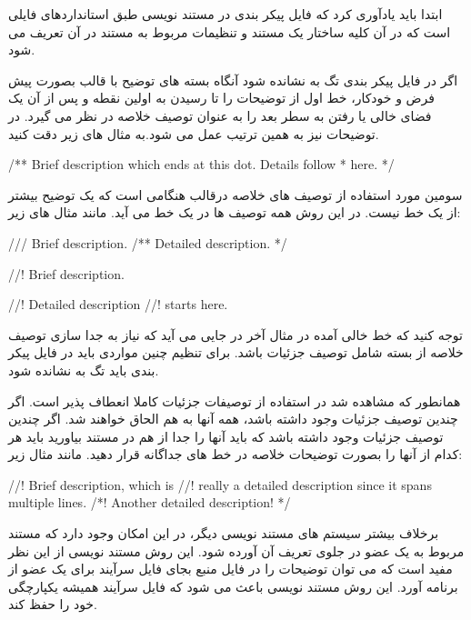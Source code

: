 ابتدا باید یادآوری کرد که فایل پیکر بندی در مستند نویسی طبق استانداردهای
 فایلی است که در آن کلیه ساختار یک مستند و تنظیمات مربوط به مستند در
آن تعریف می شود.

اگر در فایل پیکر بندی تگ   به  نشانده شود آنگاه
بسته های توضیح با قالب  بصورت پیش فرض و خودکار، خط اول از توضیحات را
تا رسیدن به اولین نقطه و پس از آن یک فضای خالی یا رفتن به سطر بعد را به عنوان
توصیف خلاصه در نظر می گیرد.
در توضیحات  نیز به همین ترتیب عمل می شود.به مثال های زیر دقت کنید.

\begin{C++}
/** Brief description which ends at this dot. Details follow
 *  here.
 */
\end{C++}

سومین مورد استفاده از توصیف های خلاصه درقالب  هنگامی است که یک
توضیح بیشتر از یک خط نیست. در این روش همه توصیف ها در یک خط می آید. مانند مثال
های زیر:

\begin{C++}
/// Brief description.
/** Detailed description. */

//! Brief description.

//! Detailed description
//! starts here.
\end{C++}

توجه کنید که خط خالی آمده در مثال آخر در جایی می آید که نیاز به جدا سازی توصیف
خلاصه از بسته شامل توصیف جزئیات باشد.
برای تنظیم چنین مواردی باید در فایل پیکر بندی باید تگ  به
 نشانده شود.

همانطور که مشاهده شد در استفاده از توصیفات جزئیات  کاملا انعطاف پذیر
است. اگر چندین توصیف جزئیات وجود داشته باشد، همه آنها به هم الحاق خواهند شد.
اگر چندین توصیف جزئیات وجود داشته باشد که باید آنها را جدا از هم در مستند
بیاورید باید هر کدام از آنها را بصورت توضیحات خلاصه در خط های جداگانه قرار دهید.
مانند مثال زیر:

\begin{C++}
//! Brief description, which is
//! really a detailed description since it spans multiple lines.
/*! Another detailed description!
*/
\end{C++}

برخلاف بیشتر سیستم های مستند نویسی دیگر، در   این امکان وجود دارد که
مستند مربوط به یک عضو در جلوی تعریف آن آورده شود. این روش مستند نویسی از این نظر
مفید است که می توان توضیحات را در فایل منبع بجای فایل سرآیند برای یک عضو از
برنامه آورد. این روش مستند نویسی باعث می شود که فایل سرآیند همیشه یکپارچگی خود
را حفظ کند.

